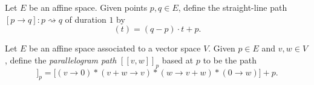 \begin{definition}
  Let $E$ be an affine space. Given points $p, q \in E$, define the straight-line path $[p \to q] \colon p \rightsquigarrow q$ of duration $1$ by
  \begin{equation}
    [p \to q](t) = (q - p) \cdot t + p.
  \end{equation}
\end{definition}

\begin{definition}
Let $E$ be an affine space associated to a vector space $V$. Given $p \in E$ and $v, w \in V$, define the \textit{parallelogram path} $[\![v, w]\!]_{p}$ based at $p$ to be the path
\begin{equation}
  [\![v, w]\!]_p = \big[(v \to 0) \ast (v + w \to v) \ast (w \to v + w) \ast (0 \to w)\big] + p.
\end{equation}
\end{definition}